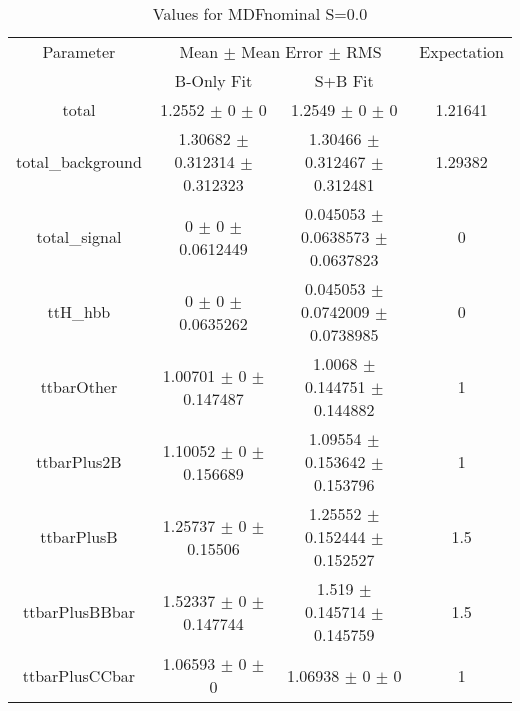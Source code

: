 \begin{table}
\centering
\caption{Values for MDFnominal S=0.0}
\begin{tabular}{cccc}
\toprule
Parameter & \multicolumn{2}{c}{Mean $\pm$ Mean Error $\pm$ RMS} & Expectation\\
 & B-Only Fit & S+B Fit & \\
\midrule
total & \num{1.2552} $\pm$ \num{0} $\pm$ \num{0} & \num{1.2549} $\pm$ \num{0} $\pm$ \num{0} & \num{1.21641}\\
total\_background & \num{1.30682} $\pm$ \num{0.312314} $\pm$ \num{0.312323} & \num{1.30466} $\pm$ \num{0.312467} $\pm$ \num{0.312481} & \num{1.29382}\\
total\_signal & \num{0} $\pm$ \num{0} $\pm$ \num{0.0612449} & \num{0.045053} $\pm$ \num{0.0638573} $\pm$ \num{0.0637823} & \num{0}\\
ttH\_hbb & \num{0} $\pm$ \num{0} $\pm$ \num{0.0635262} & \num{0.045053} $\pm$ \num{0.0742009} $\pm$ \num{0.0738985} & \num{0}\\
ttbarOther & \num{1.00701} $\pm$ \num{0} $\pm$ \num{0.147487} & \num{1.0068} $\pm$ \num{0.144751} $\pm$ \num{0.144882} & \num{1}\\
ttbarPlus2B & \num{1.10052} $\pm$ \num{0} $\pm$ \num{0.156689} & \num{1.09554} $\pm$ \num{0.153642} $\pm$ \num{0.153796} & \num{1}\\
ttbarPlusB & \num{1.25737} $\pm$ \num{0} $\pm$ \num{0.15506} & \num{1.25552} $\pm$ \num{0.152444} $\pm$ \num{0.152527} & \num{1.5}\\
ttbarPlusBBbar & \num{1.52337} $\pm$ \num{0} $\pm$ \num{0.147744} & \num{1.519} $\pm$ \num{0.145714} $\pm$ \num{0.145759} & \num{1.5}\\
ttbarPlusCCbar & \num{1.06593} $\pm$ \num{0} $\pm$ \num{0} & \num{1.06938} $\pm$ \num{0} $\pm$ \num{0} & \num{1}\\
\bottomrule
\end{tabular}
\end{table}